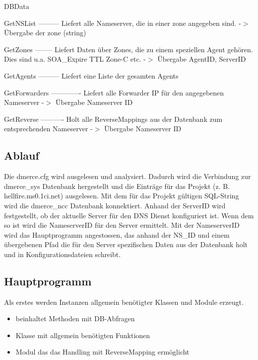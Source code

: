 DBData
        
        GetNSList
        ---------
        Liefert alle Nameserver, die in einer zone angegeben sind.
        -$>$ \"Ubergabe der zone (string)

        GetZones
        --------
        Liefert Daten \"uber Zones, die zu einem speziellen Agent geh\"oren.
        Dies sind u.a. SOA\_Expire TTL Zone-C etc.
        -$>$ \"Ubergabe AgentID, ServerID

        GetAgents
        ---------
        Liefert eine Liste der gesamten Agents

        GetForwarders
        -------------
        Liefert alle Forwarder IP f\"ur den angegebenen Nameserver
        -$>$ \"Ubergabe Nameserver ID

        GetReverse
        ----------
        Holt alle ReverseMappings aus der Datenbank zum entsprechenden
        Nameserver
        -$>$ \"Ubergabe Nameserver ID

\subsection{Ablauf}

Die dmerce.cfg wird ausgelesen und analysiert. Dadurch wird die
Verbindung zur dmerce\_sys Datenbank hergestellt und die Eintr\"age
f\"ur das Projekt (z. B. hellfire.ms0.1ci.net) ausgelesen. Mit dem
f\"ur das Projekt g\"ultigen SQL-String wird die dmerce\_ncc Datenbank
konnektiert. Anhand der ServerID wird festgestellt, ob der aktuelle
Server f\"ur den DNS Dienst konfiguriert ist. Wenn dem so ist wird die
NameserverID f\"ur den Server ermittelt. Mit der NameserverID wird das
Hauptprogramm angestossen, das anhand der NS\_ID und einem
\"ubergebenen Pfad die f\"ur den Server spezifischen Daten aus der
Datenbank holt und in Konfigurationsdateien schreibt.

\subsection{Hauptprogramm}

Als erstes werden Instanzen allgemein ben\"otigter Klassen und Module
erzeugt.

\begin{itemize}
\item {} beinhaltet Methoden mit DB-Abfragen
\item {} Klasse mit allgemein ben\"otigten Funktionen
\item {} Modul das das Handling mit
  ReverseMapping erm\"oglicht
\end{itemize}

